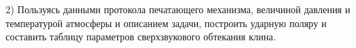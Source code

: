 \documentclass[specialist, subf, href, colorlinks=true, 14pt, final]{disser}
\theoremstyle{definition}
\begin{document}
2) Пользуясь данными протокола печатающего механизма, величиной давления и температурой атмосферы и описанием задачи, построить ударную поляру и составить таблицу параметров сверхзвукового обтекания клина.\\
\begin{figure}[!htp]
  \caption{}
  \label{1-2-5}
\end{figure}
\end{document}
